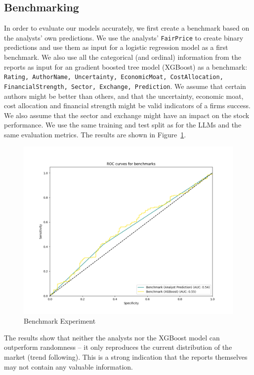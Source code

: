 \documentclass[conference]{IEEEtran}
\begin{document}
\subsection{Benchmarking}%
In order to evaluate our models accurately, we first create a benchmark based on the analysts' own predictions. We use the analysts' \texttt{FairPrice} to create binary predictions and use them  as input for a logistic regression model as a first benchmark. We also use all the categorical (and ordinal) information from the reports as input for an gradient boosted tree model (XGBoost) as a benchmark: \texttt{Rating, AuthorName, Uncertainty, EconomicMoat, CostAllocation, FinancialStrength, Sector, Exchange, Prediction}. We assume that certain authors might be better than others, and that the uncertainty, economic moat, cost allocation and financial strength might be valid indicators of a firms success. We also assume that the sector and exchange might have an impact on the stock performance. We use the same training and test split as for the LLMs and the same evaluation metrics. The results are shown in Figure~\ref{fig:Zeroexp}.

\begin{figure}[h!]
    \centering
    \includegraphics[width=.85\linewidth]{../3. evaluation/roc_curves/Zero Experiment.png}
    \caption[First Experiment]{Benchmark Experiment}
    \label{fig:Zeroexp}
\end{figure}

The results show that neither the analysts nor the XGBoost model can outperform randomness -- it only reproduces the current distribution of the market (trend following). This is a strong indication that the reports themselves may not contain any valuable information.
\end{document}
